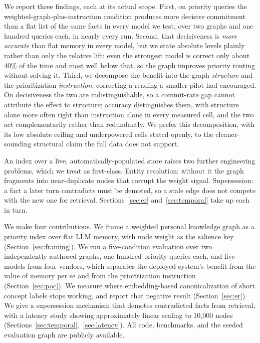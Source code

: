 \documentclass[11pt]{article}
\begin{document}
We report three findings, each at its actual scope. First, on priority queries the weighted-graph-plus-instruction condition produces more decisive commitment than a flat list of the same facts in every model we test, over two graphs and one hundred queries each, in nearly every run. Second, that decisiveness is \emph{more accurate} than flat memory in every model, but we state absolute levels plainly rather than only the relative lift: even the strongest model is correct only about 40\% of the time and most well below that, so the graph improves priority routing without solving it. Third, we decompose the benefit into the graph \emph{structure} and the prioritization \emph{instruction}, correcting a reading a smaller pilot had encouraged. On decisiveness the two are indistinguishable, so a commit-rate gap cannot attribute the effect to structure; accuracy distinguishes them, with structure alone more often right than instruction alone in every measured cell, and the two act complementarily rather than redundantly. We prefer this decomposition, with its low absolute ceiling and underpowered cells stated openly, to the cleaner-sounding structural claim the full data does not support.

An index over a live, automatically-populated store raises two further engineering problems, which we treat as first-class. Entity resolution: without it the graph fragments into near-duplicate nodes that corrupt the weight signal. Supersession: a fact a later turn contradicts must be demoted, so a stale edge does not compete with the new one for retrieval. Sections~\ref{sec:er} and~\ref{sec:temporal} take up each in turn.

We make four contributions. We frame a weighted personal knowledge graph as a priority index over flat LLM memory, with node weight as the salience key (Section~\ref{sec:framing}). We run a five-condition evaluation over two independently authored graphs, one hundred priority queries each, and five models from four vendors, which separates the deployed system's benefit from the value of memory per se and from the prioritization instruction (Section~\ref{sec:poc}). We measure where embedding-based canonicalization of short concept labels stops working, and report that negative result (Section~\ref{sec:er}). We give a supersession mechanism that demotes contradicted facts from retrieval, with a latency study showing approximately linear scaling to 10{,}000 nodes (Sections~\ref{sec:temporal},~\ref{sec:latency}). All code, benchmarks, and the seeded evaluation graph are publicly available.
\end{document}
